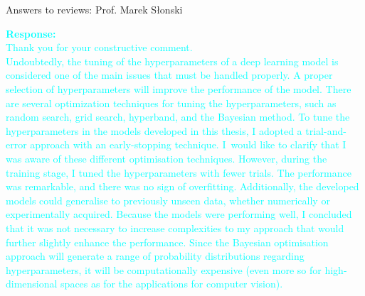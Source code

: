 \documentclass[10pt,aspectratio=169,dvipsnames]{beamer} %
\begin{document}
\begin{frame}{Answers to reviews: Prof. Marek S\l{}o{n}ski}
\begin{itemize}
{			\textcolor{Cyan}{
				\textbf{Response:}\\
				Thank you for your constructive comment. \\
				Undoubtedly, the tuning of the hyperparameters of a deep learning model is considered one of the main issues that must be handled properly.
				A proper selection of hyperparameters will improve the performance of the model. 
				There are several optimization techniques for tuning the hyperparameters, such as random search, grid search, hyperband, and the Bayesian method.
				To tune the hyperparameters in the models developed in this thesis, I adopted a trial-and-error approach with an early-stopping technique.
				I would like to clarify that I was aware of these different optimisation techniques.
				However, during the training stage, I tuned the hyperparameters with fewer trials. 
				The performance was remarkable, and there was no sign of overfitting. 
				Additionally, the developed models could generalise to previously unseen data, whether numerically or experimentally acquired.
				Because the models were performing well, I concluded that it was not necessary to increase complexities to my approach that would further slightly enhance the performance.
				Since the Bayesian optimisation approach will generate a range of probability distributions regarding hyperparameters, it will be computationally expensive (even more so for high-dimensional spaces as for the applications for computer vision). 
			}}	
			
\end{itemize}
\end{frame}
\end{document}

